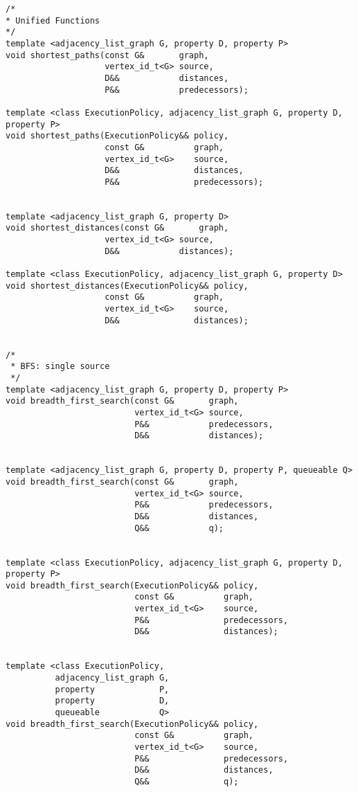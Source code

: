 \begin{lstlisting}
/*
* Unified Functions
*/
template <adjacency_list_graph G, property D, property P>
void shortest_paths(const G&       graph,
                    vertex_id_t<G> source,
                    D&&            distances,
                    P&&            predecessors);

template <class ExecutionPolicy, adjacency_list_graph G, property D, property P>
void shortest_paths(ExecutionPolicy&& policy,
                    const G&          graph,
                    vertex_id_t<G>    source,
                    D&&               distances,
                    P&&               predecessors);


template <adjacency_list_graph G, property D>
void shortest_distances(const G&       graph,
                    vertex_id_t<G> source,
                    D&&            distances);

template <class ExecutionPolicy, adjacency_list_graph G, property D>
void shortest_distances(ExecutionPolicy&& policy,
                    const G&          graph,
                    vertex_id_t<G>    source,
                    D&&               distances);


/*
 * BFS: single source
 */
template <adjacency_list_graph G, property D, property P>
void breadth_first_search(const G&       graph,
                          vertex_id_t<G> source,
                          P&&            predecessors,
                          D&&            distances);


template <adjacency_list_graph G, property D, property P, queueable Q>
void breadth_first_search(const G&       graph,
                          vertex_id_t<G> source,
                          P&&            predecessors,
                          D&&            distances,
                          Q&&            q);


template <class ExecutionPolicy, adjacency_list_graph G, property D, property P>
void breadth_first_search(ExecutionPolicy&& policy,
                          const G&          graph,
                          vertex_id_t<G>    source,
                          P&&               predecessors,
                          D&&               distances);


template <class ExecutionPolicy,
          adjacency_list_graph G,
          property             P,
          property             D,
          queueable            Q>
void breadth_first_search(ExecutionPolicy&& policy,
                          const G&          graph,
                          vertex_id_t<G>    source,
                          P&&               predecessors,
                          D&&               distances,
                          Q&&               q);


\end{lstlisting}

